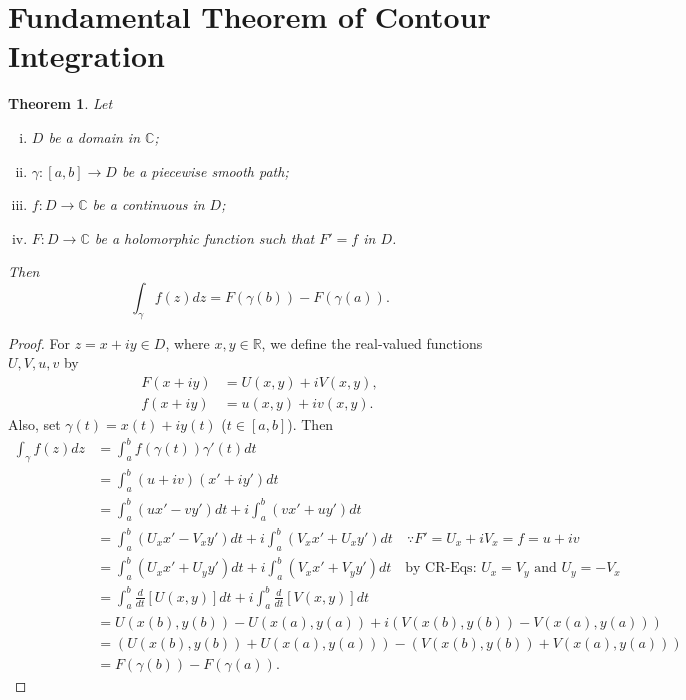 \documentclass[12pt,openany]{book}
\newtheorem{theorem}{Theorem}[chapter]
\theoremstyle{definition}
\newcommand{\R}{\mathbb{R}}
\newcommand{\C}{\mathbb{C}}
\newcommand{\of}[1]{\left( #1 \right)}
\begin{document}
	\section{Fundamental Theorem of Contour Integration}
	
	\begin{tcolorbox}[colback=white,colframe=thmcolor,arc=5pt,title={\color{white}\bf Fundamental Theorem of Contour Integration}]
		\begin{theorem}
			Let \begin{enumerate}[(i)]
				\item $D$ be a domain in $\C$;
				\item $\gamma:[a,b]\to D$ be a piecewise smooth path;
				\item $f:D\to\C$ be a continuous in $D$;
				\item $F:D\to\C$ be a holomorphic function such that $F'=f$ in $D$.
			\end{enumerate} Then \[
			\int_\gamma f\of{z}dz=F\of{\gamma\of{b}}-F\of{\gamma\of{a}}.
			\]
		\end{theorem}
	\end{tcolorbox}
	\begin{proof}
		For $z=x+iy\in D$, where $x,y\in\R$, we define the real-valued functions $U,V,u,v$ by \begin{align*}
			F(x+iy)&=U(x,y)+iV(x,y),\\
			f(x+iy)&=u(x,y)+iv(x,y).
		\end{align*} Also, set $\gamma\of{t}=x\of{t}+iy\of{t}$ ($t\in[a,b]$). Then
		\begin{align*}
			\int_\gamma f\of{z}dz&=\int_a^bf\of{\gamma\of{t}}\gamma'\of{t}dt\\
			&=\int_a^b\of{u+iv}\of{x'+iy'}dt\\
			&=\int_a^b\of{ux'-vy'}dt +i\int_a^b\of{vx'+uy'}dt\\
			&=\int_a^b\of{U_xx'-V_xy'}dt +i\int_a^b\of{V_xx'+U_xy'}dt\quad\because F'=U_x+iV_x=f=u+iv\\
			&=\int_a^b\of{U_xx'+U_yy'}dt +i\int_a^b\of{V_xx'+V_yy'}dt\quad\text{by CR-Eqs: $U_x=V_y$ and $U_y=-V_x$}\\
			&=\int_a^b\frac{d}{dt}\left[U(x,y)\right]dt+i\int_a^b\frac{d}{dt}\left[V(x,y)\right]dt\\
			&=U\of{x(b),y(b)}-U\of{x(a),y(a)}+i\of{V\of{x(b),y(b)}-V\of{x(a),y(a)}}\\
			&=\of{U\of{x(b),y(b)}+U\of{x(a),y(a)}}-\of{V\of{x(b),y(b)}+V\of{x(a),y(a)}}\\
			&=F\of{\gamma\of{b}}-F\of{\gamma\of{a}}.
		\end{align*}
	\end{proof}
	
\end{document}
